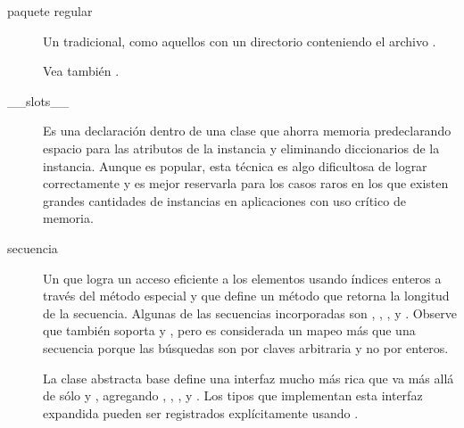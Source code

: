 \documentclass[a4,10pt,spanish]{sphinxmanual}
\begin{document}
\begin{description}
\item[{paquete regular\label{\detokenize{glossary:term-regular-package}}}] \leavevmode
\sphinxAtStartPar
Un  {\hyperref[\detokenize{glossary:term-package}]{}} tradicional, como aquellos con un directorio conteniendo el archivo .

\sphinxAtStartPar
Vea también {\hyperref[\detokenize{glossary:term-namespace-package}]{}}.

\item[{\_\_slots\_\_\label{\detokenize{glossary:term-__slots__}}}] \leavevmode
\sphinxAtStartPar
Es una declaración dentro de una clase que ahorra memoria predeclarando espacio para las atributos de la instancia y eliminando diccionarios de la instancia.  Aunque es popular, esta técnica es algo dificultosa de lograr correctamente y es mejor reservarla para los casos raros en los que existen grandes cantidades de instancias en aplicaciones con uso crítico de memoria.

\item[{secuencia\label{\detokenize{glossary:term-sequence}}}] \leavevmode
\sphinxAtStartPar
Un {\hyperref[\detokenize{glossary:term-iterable}]{}} que logra un acceso eficiente a los elementos usando índices enteros a través del método especial  y que define un método  que retorna la longitud de la secuencia. Algunas de las secuencias incorporadas son , , , y . Observe que  también soporta  y , pero es considerada un mapeo más que una secuencia porque las búsquedas son por claves arbitraria {\hyperref[\detokenize{glossary:term-immutable}]{}} y no por enteros.

\sphinxAtStartPar
La clase abstracta base  define una interfaz mucho más rica que va más allá de sólo  y , agregando , , , y . Los tipos que implementan esta interfaz expandida pueden ser registrados explícitamente usando .


\end{description}
\end{document}
